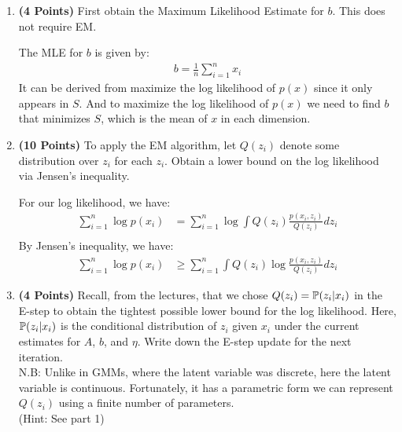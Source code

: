 \begin{enumerate}
\item \textbf{(4 Points)}
First obtain the Maximum Likelihood Estimate for $b$. This does not require EM.

\begin{soln}
  The MLE for $b$ is given by:
  \begin{align*}
    b = \frac{1}{n} \sum_{i=1}^n x_i
  \end{align*}
  It can be derived from maximize the log likelihood of $p(x)$ since it only appears in $S$. And to maximize the log likelihood of $p(x)$ we need to find $b$ that minimizes $S$, which is the mean of $x$ in each dimension.
\end{soln}

\item \textbf{(10 Points)}
To apply the EM algorithm,
let $Q(z_i)$  denote some distribution over $z_i$ for each $z_i$.
Obtain a lower bound on the log likelihood via Jensen's inequality.

\begin{soln}
  For our log likelihood, we have:
  \begin{align*}
    \sum_{i=1}^n \log p(x_i) &= \sum_{i=1}^n \log \int Q(z_i) \frac{p(x_i, z_i)}{Q(z_i)} dz_i \\
  \end{align*}
  By Jensen's inequality, we have:
  \begin{align*}
    \sum_{i=1}^n \log p(x_i) &\geq \sum_{i=1}^n \int Q(z_i) \log \frac{p(x_i, z_i)}{Q(z_i)} dz_i 
  \end{align*}
\end{soln}

\item \textbf{(4 Points)}
Recall, from the lectures, that we chose
$Q(z_i) =  \mathbb{P}(z_i|x_i)$ in the E-step to obtain the tightest
possible lower bound for the log likelihood.
Here, $ \mathbb{P}(z_i|x_i)$ is the conditional distribution of $z_i$
given $x_i$ under the current estimates for $A$, $b$, and $\eta$.
Write down the E-step update for the next iteration. \\
N.B: Unlike in GMMs, where the latent variable was discrete, here the latent variable is continuous. Fortunately, it has a parametric form we can represent $Q(z_i)$ using a finite number of parameters. \\
(Hint: See part 1)


\end{enumerate}
